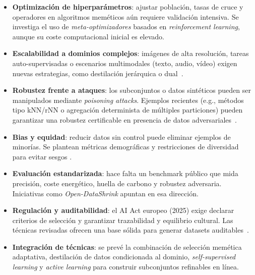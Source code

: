 \begin{itemize}
      \item \textbf{Optimización de hiperparámetros}: ajustar población, tasas de cruce y operadores en algoritmos meméticos aún requiere validación intensiva.
            Se investiga el uso de \textit{meta-optimizadores} basados en \textit{reinforcement learning}, aunque su coste computacional inicial es elevado.

      \item \textbf{Escalabilidad a dominios complejos}: imágenes de alta resolución, tareas auto-supervisadas o escenarios multimodales (texto, audio, vídeo) exigen nuevas estrategias,
            como destilación jerárquica o dual~\cite{liGenerativeDatasetDistillation2024a, liGenerativeDatasetDistillation2024}.

      \item \textbf{Robustez frente a ataques}: los subconjuntos o datos sintéticos pueden ser manipulados mediante \textit{poisoning attacks}.
            Ejemplos recientes (e.g., métodos tipo kNN/rNN o agregación determinista de múltiples particiones)
            pueden garantizar una robustez certificable en presencia de datos adversariales~\cite{jiaCertifiedRobustnessNearest2021, wangImprovedCertifiedDefenses2022}.

      \item \textbf{Bias y equidad}: reducir datos sin control puede eliminar ejemplos de minorías.
            Se plantean métricas demográficas y restricciones de diversidad para evitar sesgos \cite{pmlr-v81-buolamwini18a}.

      \item \textbf{Evaluación estandarizada}: hace falta un benchmark público que mida precisión, coste energético, huella de carbono y robustez adversaria.
            Iniciativas como \textit{Open-DataShrink} apuntan en esa dirección.

      \item \textbf{Regulación y auditabilidad}: el AI Act europeo (2025) exige declarar criterios de selección y garantizar trazabilidad y equilibrio cultural.
            Las técnicas revisadas ofrecen una base sólida para generar datasets auditables~\cite{RegulationEU20242024}.

      \item \textbf{Integración de técnicas}: se prevé la combinación de selección memética adaptativa, destilación de datos condicionada al dominio,
            \textit{self-supervised learning} y \textit{active learning} para construir subconjuntos refinables en línea.
\end{itemize}